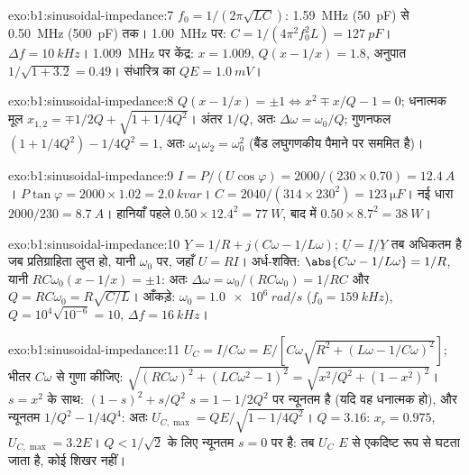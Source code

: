 \begin{solution}{exo:b1:sinusoidal-impedance:7}
$f_0 = 1/(2\pi\sqrt{LC})$: \qty{1.59}{MHz} (\qty{50}{pF}) से \qty{0.50}{MHz}
(\qty{500}{pF}) तक। \qty{1.00}{MHz} पर: $C = 1/(4\pi^2f_0^2L) = \qty{127}{pF}$।
$\Delta f = \qty{10}{kHz}$। \qty{1.009}{MHz} पर केंद्र: $x = 1.009$,
$Q(x - 1/x) = 1.8$, अनुपात $1/\sqrt{1 + 3.2} = 0.49$। संधारित्र का 
$QE = \qty{1.0}{mV}$।
\end{solution}

\begin{solution}{exo:b1:sinusoidal-impedance:8}
$Q(x - 1/x) = \pm1 \Leftrightarrow x^2 \mp x/Q - 1 = 0$; धनात्मक मूल
$x_{1,2} = \mp 1/2Q + \sqrt{1 + 1/4Q^2}$। अंतर $1/Q$, अतः
$\Delta\omega = \omega_0/Q$; गुणनफल $(1 + 1/4Q^2) - 1/4Q^2 = 1$, अतः
$\omega_1\omega_2 = \omega_0^2$ (बैंड लघुगणकीय पैमाने पर सममित है)।
\end{solution}

\begin{solution}{exo:b1:sinusoidal-impedance:9}
$I = P/(U\cos\varphi) = 2000/(230 \times 0.70) = \qty{12.4}{A}$।  $P\tan\varphi = 2000 \times 1.02 = \qty{2.0}{kvar}$। $C = 2040/(314
\times 230^2) = \qty{123}{\micro F}$। नई धारा $2000/230 = \qty{8.7}{A}$।
हानियाँ पहले $0.50 \times 12.4^2 = \qty{77}{W}$, बाद में $0.50 \times 8.7^2 =
\qty{38}{W}$।
\end{solution}

\begin{solution}{exo:b1:sinusoidal-impedance:10}
$\underline Y = 1/R + j(C\omega - 1/L\omega)$; $\underline U = \underline I/
\underline Y$ तब अधिकतम है जब प्रतिग्राहिता लुप्त हो, यानी $\omega_0$ पर,
जहाँ $U = RI$। अर्ध-शक्ति: $\abs{C\omega - 1/L\omega} = 1/R$, यानी
$RC\omega_0(x - 1/x) = \pm1$: अतः $\Delta\omega = \omega_0/(RC\omega_0) = 1/RC$
और $Q = RC\omega_0 = R\sqrt{C/L}$। आँकड़े: $\omega_0 = \qty{1.0e6}{rad/s}$
($f_0 = \qty{159}{kHz}$), $Q = 10^4\sqrt{10^{-6}} = 10$, $\Delta f =
\qty{16}{kHz}$।
\end{solution}

\begin{solution}{exo:b1:sinusoidal-impedance:11}
$U_C = I/C\omega = E/[C\omega\sqrt{R^2 + (L\omega - 1/C\omega)^2}]$;
भीतर $C\omega$ से गुणा कीजिए: $\sqrt{(RC\omega)^2 + (LC\omega^2 - 1)^2} =
\sqrt{x^2/Q^2 + (1 - x^2)^2}$। $s = x^2$ के साथ: $(1 - s)^2 + s/Q^2$
$s = 1 - 1/2Q^2$ पर न्यूनतम है (यदि वह धनात्मक हो), और न्यूनतम $1/Q^2 - 1/4Q^4$:
अतः $U_{C,\max} = QE/\sqrt{1 - 1/4Q^2}$। $Q = 3.16$: $x_r = 0.975$,
$U_{C,\max} = 3.2E$। $Q < 1/\sqrt2$ के लिए न्यूनतम $s = 0$ पर है: तब $U_C$
$E$ से एकदिष्ट रूप से घटता जाता है, कोई शिखर नहीं।
\end{solution}

